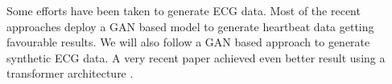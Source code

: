 Some efforts have been taken to generate ECG data. Most of the recent approaches deploy a GAN based model to generate heartbeat data \Parencite[see e. g.][]{zhu2019electrocardiogram,Delaney2019SynthesisOR,wang2020accurate} getting favourable results. We will also follow a GAN based approach to generate synthetic ECG data. A very recent paper achieved even better result using a transformer architecture \Parencite[see][]{Kaleli2023GenerationOS}.  
